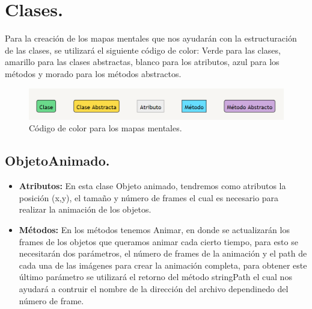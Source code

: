 \documentclass{article}
\begin{document}
\section{Clases.}
Para la creación de los mapas mentales que nos ayudarán con la estructuración de las clases, se utilizará el siguiente código de color: Verde para las clases, amarillo para las clases abstractas, blanco para los atributos, azul para los métodos y morado para los métodos abstractos.

\begin{figure}[h]
\includegraphics[scale=0.8]{Images/colores.png}
\centering
\caption{Código de color para los mapas mentales.}
\label{fig:codigo}
\end{figure}

\subsection{ObjetoAnimado.}\label{objeto_animado}
\begin{itemize}
  \item \textbf{Atributos:} En esta clase Objeto animado, tendremos como atributos la posición (x,y), el tamaño y número de frames el cual es necesario para realizar la animación de los objetos.
  
  \item \textbf{Métodos:} En los métodos tenemos Animar, en donde se actualizarán los frames de los objetos que queramos animar cada cierto tiempo, para esto se necesitarán dos parámetros, el número de frames de la animación y el path de cada una de las imágenes para crear la animación completa, para obtener este último parámetro se utilizará el retorno del método stringPath el cual nos ayudará a contruir el nombre de la dirección del archivo dependinedo del número de frame.
\end{itemize}
\end{document}
